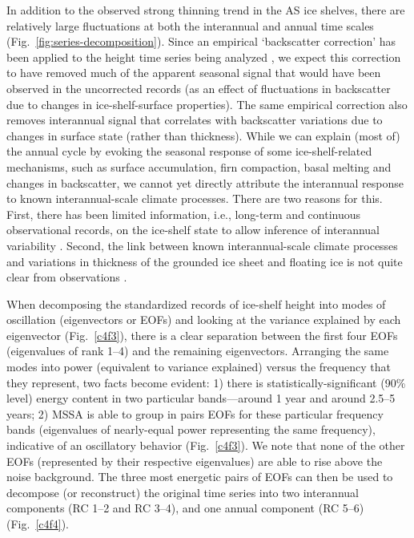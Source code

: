 In addition to the observed strong thinning trend in the AS ice shelves, there are relatively large fluctuations at both the interannual and annual time scales (Fig.~\ref{fig:series-decomposition}). Since an empirical `backscatter correction' has been applied to the height time series being analyzed \parencite{Paolo2015a}, we expect this correction to have removed much of the apparent seasonal signal that would have been observed in the uncorrected records (as an effect of fluctuations in backscatter due to changes in ice-shelf-surface properties). The same empirical correction also removes interannual signal that correlates with backscatter variations due to changes in surface state (rather than thickness). While we can explain (most of) the annual cycle by evoking the seasonal response of some ice-shelf-related mechanisms, such as surface accumulation, firn compaction, basal melting and changes in backscatter, we cannot yet directly attribute the interannual response to known interannual-scale climate processes. There are two reasons for this. First, there has been limited information, i.e., long-term and continuous observational records, on the ice-shelf state to allow inference of interannual variability \parencite{Paolo2015}. Second, the link between known interannual-scale climate processes and variations in thickness of the grounded ice sheet and floating ice is not quite clear from observations \parencite[e.g.,][]{Dutrieux2014, Steig2013, Turner2004}. 

When decomposing the standardized records of ice-shelf height into modes of oscillation (eigenvectors or EOFs) and looking at the variance explained by each eigenvector (Fig.~\ref{c4f3}), there is a clear separation between the first four EOFs (eigenvalues of rank 1--4) and the remaining eigenvectors. Arranging the same modes into power (equivalent to variance explained) versus the frequency that they represent, two facts become evident: 1) there is statistically-significant (90\% level) energy content in two particular bands---around 1 year and around 2.5--5 years; 2) MSSA is able to group in pairs EOFs for these particular frequency bands (eigenvalues of nearly-equal power representing the same frequency), indicative of an oscillatory behavior (Fig.~\ref{c4f3}). We note that none of the other EOFs (represented by their respective eigenvalues) are able to rise above the noise background. The three most energetic pairs of EOFs can then be used to decompose (or reconstruct) the original time series into two interannual components (RC 1--2 and RC 3--4), and one annual component (RC 5--6) (Fig.~\ref{c4f4}).



